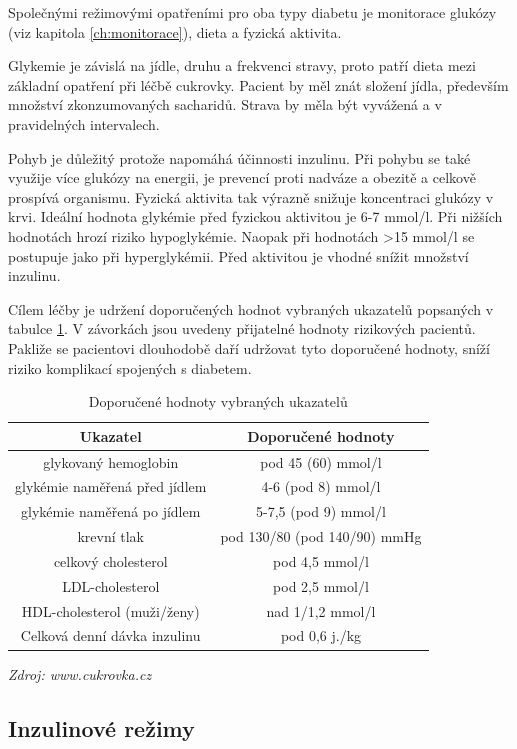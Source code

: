 Společnými režimovými opatřeními pro oba typy diabetu je monitorace glukózy (viz kapitola \ref{ch:monitorace}), dieta a fyzická aktivita.

Glykemie je závislá na jídle, druhu a frekvenci stravy, proto patří dieta mezi základní opatření při léčbě cukrovky. Pacient by měl znát složení jídla, především množství zkonzumovaných sacharidů. Strava by měla být vyvážená a v pravidelných intervalech.

Pohyb je důležitý protože napomáhá účinnosti inzulinu. Při pohybu se také využije více glukózy na energii, je prevencí proti nadváze a obezitě a celkově prospívá organismu. Fyzická aktivita tak výrazně snižuje koncentraci glukózy v krvi. Ideální hodnota glykémie před fyzickou aktivitou je 6-7 mmol/l. Při nižších hodnotách hrozí riziko hypoglykémie. Naopak při hodnotách >15 mmol/l se postupuje jako při hyperglykémii. Před aktivitou je vhodné snížit množství inzulinu.

Cílem léčby je udržení doporučených hodnot vybraných ukazatelů popsaných v tabulce \ref{tab:ukazatele}. V závorkách jsou uvedeny přijatelné hodnoty rizikových pacientů. Pakliže se pacientovi dlouhodobě daří udržovat tyto doporučené hodnoty, sníží riziko komplikací spojených s diabetem.
\cite{Diabetes.Psottova,cukrovka.cz}

\begin{table}[H]
\caption{Doporučené hodnoty vybraných ukazatelů}
\label{tab:ukazatele}
\centering
\begin{tabular}{|c|c|}
\hline 
\textbf{Ukazatel} & \textbf{Doporu\v{c}ené hodnoty}\tabularnewline
\hline 
\hline 
glykovaný hemoglobin & pod 45 (60) mmol/l\\ \hline 
glykémie naměřená před jídlem & 4-6 (pod 8) mmol/l\\ \hline 
glykémie naměřená po jídlem & 5-7,5 (pod 9) mmol/l\\ \hline 
krevní tlak & pod 130/80 (pod 140/90) mmHg\\ \hline 
celkový cholesterol & pod 4,5 mmol/l\\ \hline 
LDL-cholesterol & pod 2,5 mmol/l\\ \hline 
HDL-cholesterol (muži/ženy) & nad 1/1,2 mmol/l\\ \hline 
Celková denní dávka inzulinu & pod 0,6 j./kg\\
\hline 
\end{tabular}
\textit{Zdroj: www.cukrovka.cz \citep{cukrovka.cz}}
\end{table}


\subsection{Inzulinové režimy}
\label{ch:inzulin}

